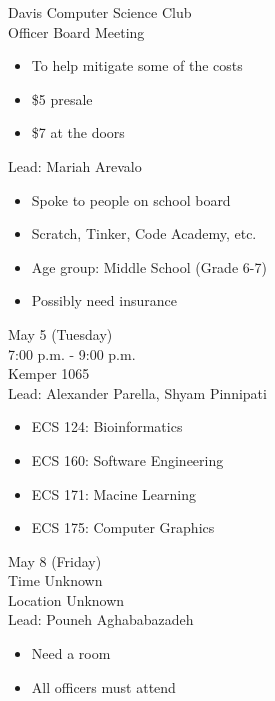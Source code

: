 \documentclass{article}
\begin{document}
\begin{Minutes}{Davis Computer Science Club\\Officer Board Meeting}

\begin{itemize}
	\item To help mitigate some of the costs
	\item \$5 presale
	\item \$7 at the doors
\end{itemize}


Lead: Mariah Arevalo

\begin{itemize}
	\item Spoke to people on school board
	\item Scratch, Tinker, Code Academy, etc.
	\item Age group: Middle School (Grade 6-7)
	\item Possibly need insurance
\end{itemize}


May 5 (Tuesday)\\
7:00 p.m. - 9:00 p.m.\\
Kemper 1065\\
Lead: Alexander Parella, Shyam Pinnipati

\begin{itemize}
	\item ECS 124: Bioinformatics
	\item ECS 160: Software Engineering
	\item ECS 171: Macine Learning
	\item ECS 175: Computer Graphics
\end{itemize}


May 8 (Friday)\\
Time Unknown\\
Location Unknown\\
Lead: Pouneh Aghababazadeh

\begin{itemize}
	\item Need a room
	\item All officers must attend
\end{itemize}




\end{Minutes}
\end{document}
